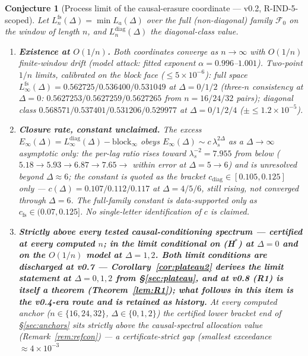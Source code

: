 \documentclass[11pt]{article}
\newtheorem{conjecture}{Conjecture}
\theoremstyle{definition}
\theoremstyle{remark}
\begin{document}
\begin{conjecture}[Process limit of the causal-erasure coordinate ---
v0.2, R-IND-5-scoped]
\label{conj:proc}
Let $L^{\mathrm{fs}}_n(\Delta)=\min L_a(\Delta)$ over the full
(non-diagonal) family $\mathcal F_0$ on the window of length $n$,
and $L^{\mathrm{diag}}_n(\Delta)$ the diagonal-class value.
\begin{enumerate}
\item[(1)] \textbf{Existence at $O(1/n)$.} Both coordinates converge
as $n\to\infty$ with $O(1/n)$ finite-window drift (model attack:
fitted exponent $\alpha=0.996$--$1.001$). Two-point $1/n$ limits,
calibrated on the block face ($\le5\times10^{-6}$): full space
$L^{\mathrm{fs}}_\infty(\Delta)=0.562725/0.536400/0.531049$ at
$\Delta=0/1/2$ (three-$n$ consistency at $\Delta=0$:
$0.5627253/0.5627259/0.5627265$ from $n=16/24/32$ pairs); diagonal
class $0.568571/0.537401/0.531206/0.529977$ at $\Delta=0/1/2/4$
($\pm\le1.2\times10^{-5}$).
\item[(2)] \textbf{Closure rate, constant unclaimed.} The excess
$E_\infty(\Delta)=L^{\mathrm{diag}}_\infty(\Delta)-
\mathrm{block}_\infty$ obeys $E_\infty(\Delta)\sim
c\,\lambda_s^{2\Delta}$ \emph{as a $\Delta\to\infty$ asymptotic
only}: the per-lag ratio rises toward $\lambda_s^{-2}=7.955$
\emph{from below} ($5.18\to5.93\to6.87\to7.65\to$ within error at
$\Delta=5\to6$) and is \emph{unresolved beyond $\Delta\approx6$};
the constant is quoted as the bracket
$c_{\mathrm{diag}}\in[0.105,0.125]$ \emph{only} ---
$c(\Delta)=0.107/0.112/0.117$ at $\Delta=4/5/6$, still rising,
\emph{not converged through $\Delta=6$}. The full-family constant is
data-supported only as $c_{\mathrm{fs}}\in(0.07,0.125]$. No
single-letter identification of $c$ is claimed.
\item[(3)] \textbf{Strictly above every tested causal-conditioning
spectrum --- certified at every computed $n$; in the limit
conditional on (H$^\ast$) at $\Delta=0$ and on the $O(1/n)$ model at
$\Delta=1,2$. \emph{Both limit conditions are discharged at v0.7} ---
Corollary~\ref{cor:plateau2} derives the limit statement at
$\Delta=0,1,2$ from \S\ref{sec:plateau}, and at v0.8 (R1) is itself a
theorem (Theorem~\ref{lem:R1});
what follows in this item is the v0.4-era route and is retained as
history.} At every computed anchor
($n\in\{16,24,32\}$, $\Delta\in\{0,1,2\}$) the \emph{certified lower
bracket end} of \S\ref{sec:anchors} sits strictly above the
causal-spectral allocation value (Remark~\ref{rem:refcon}) --- a
certificate-strict gap (smallest exceedance $\approx4\times10^{-3}$

\end{enumerate}
\end{conjecture}
\end{document}
